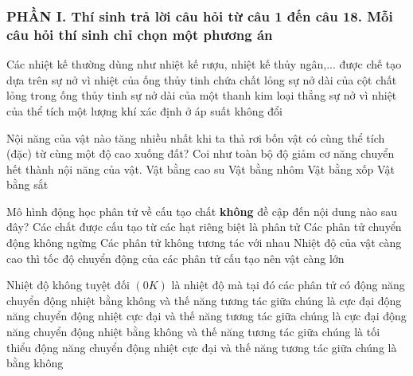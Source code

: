 \subsubsection*{PHẦN I. Thí sinh trả lời câu hỏi từ câu 1 đến câu 18. Mỗi câu hỏi thí sinh chỉ chọn một phương án}
\setcounter{ex}{0}
\begin{ex}
Các nhiệt kế thường dùng như nhiệt kế rượu, nhiệt kế thủy ngân,... được chế tạo dựa trên
\choice
{sự nở vì nhiệt của ống thủy tinh chứa chất lỏng}
{\True sự nở dài của cột chất lỏng trong ống thủy tinh}
{sự nở dài của một thanh kim loại thẳng}
{sự nở vì nhiệt của thể tích một lượng khí xác định ở áp suất không đổi}
\loigiai{}
\end{ex}
\begin{ex}
Nội năng của vật nào tăng nhiều nhất khi ta thả rơi bốn vật có cùng thể tích (đặc) từ cùng một độ cao xuống đất? Coi như toàn bộ độ giảm cơ năng chuyển hết thành nội năng của vật.
\choice
{Vật bằng cao su}
{Vật bằng nhôm}
{Vật bằng xốp}
{\True Vật bằng sắt}
\loigiai{}
\end{ex}
\begin{ex}
Mô hình động học phân tử về cấu tạo chất \textbf{không} đề cập đến nội dung nào sau đây?
\choice
{Các chất được cấu tạo từ các hạt riêng biệt là phân tử}
{Các phân tử chuyển động không ngừng}
{\True Các phân tử không tương tác với nhau}
{Nhiệt độ của vật càng cao thì tốc độ chuyển động của các phân tử cấu tạo nên vật càng lớn}
\loigiai{}
\end{ex}
\begin{ex}
Nhiệt độ không tuyệt đối $(0 K)$ là nhiệt độ mà tại đó các phân tử có
\choice
{động năng chuyển động nhiệt bằng không và thế năng tương tác giữa chúng là cực đại}
{động năng chuyển động nhiệt cực đại và thế năng tương tác giữa chúng là cực đại}
{\True động năng chuyển động nhiệt bằng không và thế năng tương tác giữa chúng là tối thiểu}
{động năng chuyển động nhiệt cực đại và thế năng tương tác giữa chúng là bằng không}
\loigiai{}
\end{ex}
\begin{ex}
\loigiai{}
\end{ex}
